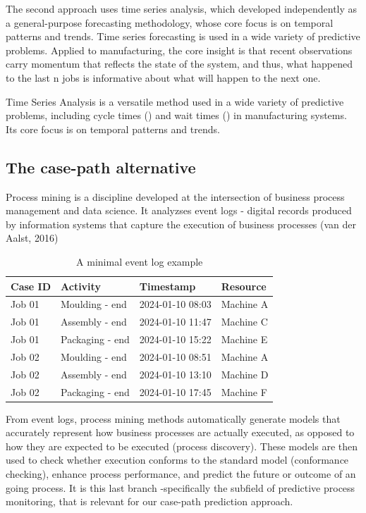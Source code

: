 \documentclass[
]{ceurart}
\begin{document}
The second approach uses time series analysis, which developed independently as a general-purpose forecasting methodology, whose core focus is on temporal patterns and trends. Time series forecasting is used in a wide variety of predictive problems. Applied to manufacturing,
the core insight is that recent observations carry momentum that reflects the state of the system, and thus, what happened to the last n jobs is informative about what will happen to the next one. 



  Time Series Analysis is a versatile method used in a wide variety of predictive problems, including cycle times () and wait times () in manufacturing systems. Its core focus is on temporal patterns and trends.

\subsection{The case-path alternative}

Process mining is a discipline developed at the intersection of business process management and data science. It analyzses event logs - digital records produced by information systems that capture the execution of business processes (van der Aalst, 2016)

\begin{table}[h]
\centering
\caption{A minimal event log example}
\label{tab:eventlog}
\begin{tabular}{llll}
\toprule
\textbf{Case ID} & \textbf{Activity} & \textbf{Timestamp} & \textbf{Resource} \\
\midrule
Job 01 & Moulding - end  & 2024-01-10 08:03 & Machine A \\
Job 01 & Assembly - end  & 2024-01-10 11:47 & Machine C \\
Job 01 & Packaging - end & 2024-01-10 15:22 & Machine E \\
Job 02 & Moulding - end  & 2024-01-10 08:51 & Machine A \\
Job 02 & Assembly - end  & 2024-01-10 13:10 & Machine D \\
Job 02 & Packaging - end & 2024-01-10 17:45 & Machine F \\
\bottomrule
\end{tabular}
\end{table}

From event logs, process mining methods automatically generate models that accurately represent how business processes are actually executed, 
as opposed to how they are expected to be executed (process discovery). These models are then used to check whether execution conforms to the standard model (conformance checking), enhance
process performance, and predict the future or outcome of an going process. It is this last branch -specifically the subfield of predictive process monitoring, 
that is relevant for our case-path prediction approach.
\end{document}
